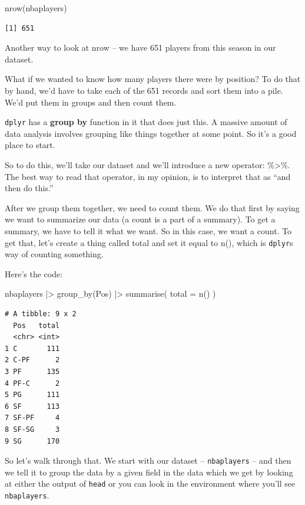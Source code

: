 \documentclass[
  letterpaper,
  DIV=11,
  numbers=noendperiod]{scrreprt}
\newenvironment{Shaded}{\begin{snugshade}}{\end{snugshade}}
\newcommand{\AttributeTok}[1]{\textcolor[rgb]{0.40,0.45,0.13}{#1}}
\newcommand{\FunctionTok}[1]{\textcolor[rgb]{0.28,0.35,0.67}{#1}}
\newcommand{\NormalTok}[1]{\textcolor[rgb]{0.00,0.23,0.31}{#1}}
\newcommand{\SpecialCharTok}[1]{\textcolor[rgb]{0.37,0.37,0.37}{#1}}
\begin{document}
\begin{Shaded}
\begin{Highlighting}[]
\FunctionTok{nrow}\NormalTok{(nbaplayers)}
\end{Highlighting}
\end{Shaded}

\begin{verbatim}
[1] 651
\end{verbatim}

Another way to look at nrow -- we have 651 players from this season in
our dataset.

What if we wanted to know how many players there were by position? To do
that by hand, we'd have to take each of the 651 records and sort them
into a pile. We'd put them in groups and then count them.

\texttt{dplyr} has a \textbf{group by} function in it that does just
this. A massive amount of data analysis involves grouping like things
together at some point. So it's a good place to start.

So to do this, we'll take our dataset and we'll introduce a new
operator: \%\textgreater\%. The best way to read that operator, in my
opinion, is to interpret that as ``and then do this.''

After we group them together, we need to count them. We do that first by
saying we want to summarize our data (a count is a part of a summary).
To get a summary, we have to tell it what we want. So in this case, we
want a count. To get that, let's create a thing called total and set it
equal to n(), which is \texttt{dplyr}s way of counting something.

Here's the code:

\begin{Shaded}
\begin{Highlighting}[]
\NormalTok{nbaplayers }\SpecialCharTok{|\textgreater{}}
  \FunctionTok{group\_by}\NormalTok{(Pos) }\SpecialCharTok{|\textgreater{}}
  \FunctionTok{summarise}\NormalTok{(}
    \AttributeTok{total =} \FunctionTok{n}\NormalTok{()}
\NormalTok{  )}
\end{Highlighting}
\end{Shaded}

\begin{verbatim}
# A tibble: 9 x 2
  Pos   total
  <chr> <int>
1 C       111
2 C-PF      2
3 PF      135
4 PF-C      2
5 PG      111
6 SF      113
7 SF-PF     4
8 SF-SG     3
9 SG      170
\end{verbatim}

So let's walk through that. We start with our dataset --
\texttt{nbaplayers} -- and then we tell it to group the data by a given
field in the data which we get by looking at either the output of
\texttt{head} or you can look in the environment where you'll see
\texttt{nbaplayers}.
\end{document}
